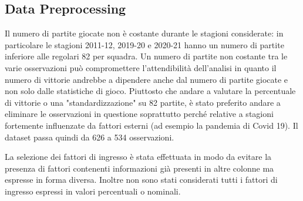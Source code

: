 \documentclass[11pt,a4paper]{article}
\begin{document}
\subsection{Data Preprocessing}
Il numero di partite giocate non è costante durante le stagioni considerate: in particolare le stagioni 2011-12, 2019-20 e 2020-21 hanno un numero di partite inferiore alle regolari 82 per squadra. 
Un numero di partite non costante tra le varie osservazioni può compromettere l'attendibilità dell'analisi in quanto il numero di vittorie andrebbe a dipendere anche dal numero di partite giocate e non solo dalle statistiche di gioco. 
Piuttosto che andare a valutare la percentuale di vittorie o una "standardizzazione" su 82 partite, è stato preferito andare a eliminare le osservazioni in questione soprattutto perché relative a stagioni fortemente influenzate da fattori esterni (ad esempio la pandemia di Covid 19). 
Il dataset passa quindi da 626 a 534 osservazioni.

La selezione dei fattori di ingresso è stata effettuata in modo da evitare la presenza di fattori contenenti informazioni già presenti in altre colonne ma espresse in forma diversa.
Inoltre non sono stati considerati tutti i fattori di ingresso espressi in valori percentuali o nominali.
\end{document}

